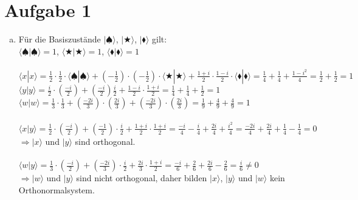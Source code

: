 \documentclass[a4paper]{scrartcl}
\begin{document}
\section*{Aufgabe 1}
\begin{enumerate}[a)]

\item Für die Basiszustände $|\spadesuit\rangle$, $|\bigstar\rangle$, $|\blacklozenge\rangle$ gilt:\\
$\langle\spadesuit|\spadesuit\rangle = 1$, $\langle\bigstar|\bigstar\rangle = 1$, $\langle\blacklozenge|\blacklozenge\rangle = 1$\\\\

$\langle x|x\rangle= \frac{1}{2}\cdot\frac{1}{2}\cdot\langle\spadesuit|\spadesuit\rangle + (-\frac{1}{2})\cdot(-\frac{1}{2})\cdot\langle\bigstar|\bigstar\rangle+\frac{1+i}{2}\cdot\frac{1-i}{2}\cdot\langle\blacklozenge|\blacklozenge\rangle= \frac{1}{4}+\frac{1}{4}+\frac{1-i^2}{4}= \frac{1}{2}+\frac{1}{2}=1$\\
$\langle y|y\rangle= \frac{i}{2}\cdot(\frac{-i}{2})+(\frac{-i}{2})\frac{i}{2}+\frac{1-i}{2}\cdot\frac{1+i}{2}=\frac{1}{4}+\frac{1}{4}+\frac{1}{2}=1$\\
$\langle w|w\rangle= \frac{1}{3}\cdot\frac{1}{3}+(\frac{-2i}{3})\cdot(\frac{2i}{3})+(\frac{-2i}{3})\cdot(\frac{2i}{3})=\frac{1}{9}+\frac{4}{9}+\frac{4}{9}=1$\\\\

$\langle x|y\rangle= \frac{1}{2}\cdot(\frac{-i}{2})+(\frac{-1}{2})\cdot\frac{i}{2}+\frac{1+i}{2}\cdot\frac{1+i}{2}= \frac{-i}{4}-\frac{i}{4}+\frac{2i}{4}+\frac{i^2}{4}= \frac{-2i}{4}+\frac{2i}{4}+\frac{1}{4}-\frac{1}{4}=0$\\
$\Rightarrow |x\rangle$ und $|y\rangle$ sind orthogonal.\\\\

$\langle w|y\rangle= \frac{1}{3}\cdot(\frac{-i}{2})+(\frac{-2i}{3})\cdot\frac{i}{2}+\frac{2i}{3}\cdot\frac{1+i}{2}=\frac{-i}{6}+\frac{2}{6}+\frac{2i}{6}-\frac{2}{6}=\frac{i}{6}\neq 0$\\
$\Rightarrow |w\rangle$ und $|y\rangle$ sind nicht orthogonal, daher bilden $|x\rangle$, $|y\rangle$ und $|w\rangle$ kein Orthonormalsystem.


\end{enumerate}
\end{document}
